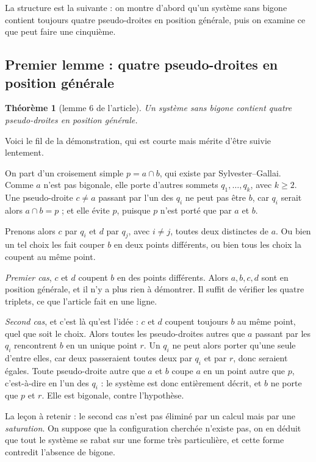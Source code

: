 \documentclass[11pt,a4paper]{amsart}
\theoremstyle{definition}
\theoremstyle{plain}
\newtheorem{theoreme}{Théorème}
\theoremstyle{remark}
\begin{document}
La structure est la suivante : on montre d'abord qu'un système sans bigone contient toujours quatre pseudo-droites en position générale, puis on examine ce que peut faire une cinquième.

\subsection{Premier lemme : quatre pseudo-droites en position générale}

\begin{theoreme}[lemme 6 de l'article]
Un système sans bigone contient quatre pseudo-droites en position générale.
\end{theoreme}

Voici le fil de la démonstration, qui est courte mais mérite d'être suivie lentement.

On part d'un croisement simple $p = a \cap b$, qui existe par Sylvester--Gallai. Comme $a$ n'est pas bigonale, elle porte d'autres sommets $q_1, \dots, q_k$, avec $k \ge 2$. Une pseudo-droite $c \ne a$ passant par l'un des $q_i$ ne peut pas être $b$, car $q_i$ serait alors $a \cap b = p$ ; et elle évite $p$, puisque $p$ n'est porté que par $a$ et $b$.

Prenons alors $c$ par $q_i$ et $d$ par $q_j$, avec $i \ne j$, toutes deux distinctes de $a$. Ou bien un tel choix les fait couper $b$ en deux points différents, ou bien tous les choix la coupent au même point.

\emph{Premier cas}, $c$ et $d$ coupent $b$ en des points différents. Alors $a, b, c, d$ sont en position générale, et il n'y a plus rien à démontrer. Il suffit de vérifier les quatre triplets, ce que l'article fait en une ligne.

\emph{Second cas}, et c'est là qu'est l'idée : $c$ et $d$ coupent toujours $b$ au même point, quel que soit le choix. Alors toutes les pseudo-droites autres que $a$ passant par les $q_i$ rencontrent $b$ en un unique point $r$. Un $q_i$ ne peut alors porter qu'une seule d'entre elles, car deux passeraient toutes deux par $q_i$ et par $r$, donc seraient égales. Toute pseudo-droite autre que $a$ et $b$ coupe $a$ en un point autre que $p$, c'est-à-dire en l'un des $q_i$ : le système est donc entièrement décrit, et $b$ ne porte que $p$ et $r$. Elle est bigonale, contre l'hypothèse.

La leçon à retenir : le second cas n'est pas éliminé par un calcul mais par une \emph{saturation}. On suppose que la configuration cherchée n'existe pas, on en déduit que tout le système se rabat sur une forme très particulière, et cette forme contredit l'absence de bigone.
\end{document}
